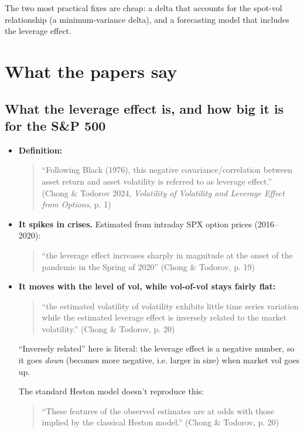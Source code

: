\documentclass{article}
\begin{document}
The two most practical fixes are cheap: a delta that accounts for the spot-vol relationship (a minimum-variance delta), and a forecasting model that includes the leverage effect.

\section{What the papers say}

\subsection{What the leverage effect is, and how big it is for the S\&P 500}

\begin{itemize}

\item \textbf{Definition:}

\begin{quote}``Following Black (1976), this negative covariance/\allowbreak{}correlation between asset return and asset volatility is referred to as leverage effect.'' (Chong \& Todorov 2024, \emph{Volatility of Volatility and Leverage Effect from Options}, p. 1)\end{quote}

\item \textbf{It spikes in crises.} Estimated from intraday SPX option prices (2016--2020):

\begin{quote}``the leverage effect increases sharply in magnitude at the onset of the pandemic in the Spring of 2020'' (Chong \& Todorov, p. 19)\end{quote}

\item \textbf{It moves with the level of vol, while vol-of-vol stays fairly flat:}

\begin{quote}``the estimated volatility of volatility exhibits little time series variation while the estimated leverage effect is inversely related to the market volatility.'' (Chong \& Todorov, p. 20)\end{quote}

``Inversely related'' here is literal: the leverage effect is a negative number, so it goes \emph{down} (becomes more negative, i.e. larger in size) when market vol goes up.

The standard Heston model doesn't reproduce this:

\begin{quote}``These features of the observed estimates are at odds with those implied by the classical Heston model.'' (Chong \& Todorov, p. 20)\end{quote}


\end{itemize}
\end{document}
